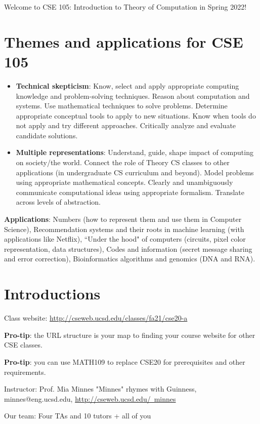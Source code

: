 \documentclass[12pt, oneside]{article}
\begin{document}
\newpage
Welcome to CSE 105: Introduction to Theory of Computation in Spring 2022!

\section*{Themes and applications for CSE 105}
\begin{itemize}
\item {\bf Technical skepticism}: Know, select and apply appropriate computing knowledge and problem-solving techniques. 
Reason about computation and systems. 
Use mathematical techniques to solve problems. 
Determine appropriate conceptual tools to apply to new situations. 
Know when tools do not apply and try different approaches. 
Critically analyze and evaluate candidate solutions.
\item {\bf Multiple representations}: Understand, guide, shape impact of computing on society/the world. 
Connect the role of Theory CS classes to other applications (in undergraduate CS curriculum and beyond). 
Model problems using appropriate mathematical concepts.
Clearly and unambiguously communicate computational ideas using appropriate formalism. 
Translate across levels of abstraction.
\end{itemize}

{\bf Applications}: Numbers (how to represent them and use them in Computer Science), 
Recommendation systems and their roots in machine learning (with applications like Netflix),
``Under the hood" of computers (circuits, pixel color representation, data structures),
Codes and information (secret message sharing and error correction),
Bioinformatics algorithms and genomics (DNA and RNA).

\section*{Introductions}
Class website: \href{http://cseweb.ucsd.edu/classes/fa21/cse20-a}{http://cseweb.ucsd.edu/classes/fa21/cse20-a}

{\bf Pro-tip}: the URL structure is your map to finding your course website for other CSE classes.

{\bf Pro-tip}: you can use MATH109 to replace CSE20 for prerequisites and other requirements.

Instructor: Prof. Mia Minnes {\tiny{"Minnes" rhymes with Guinness}}, minnes@eng.ucsd.edu, 
\href{http://cseweb.ucsd.edu/~minnes}{http://cseweb.ucsd.edu/~minnes}

Our team: Four TAs and 10 tutors + all of you
\end{document}
